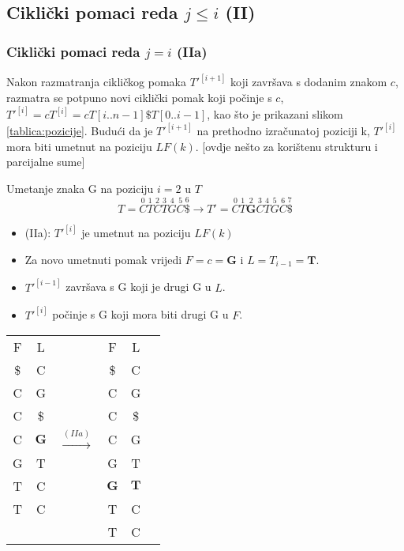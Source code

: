 \documentclass{ferseminar}
\begin{document}
\subsection{Ciklički pomaci reda $j\leq i$ (II)}
\subsubsection{Ciklički pomaci reda $j=i$ (IIa)}
Nakon razmatranja cikličkog pomaka $T'^{[i+1]}$ koji završava s dodanim znakom $c$, razmatra se potpuno novi ciklički pomak koji počinje s $c$, $T'^{[i]}=cT^{[i]}=cT[i..n-1]\$T[0..i-1]$, kao što je prikazani slikom \ref{tablica:pozicije}. Budući da je $T'^{[i+1]}$ na prethodno izračunatoj poziciji k, $T'^[i]$ mora biti umetnut na poziciju $LF(k)$. [ovdje nešto za korištenu strukturu i parcijalne sume]

\begin{minipage}{0.5\textwidth}
\footnotesize
Umetanje znaka G na poziciju $i=2$ u $T$
$$
	T=\overset{0}{C}	\overset{1}{T} \overset{2}{C} \overset{3}{T}	\overset{4}{G}
	\overset{5}{C}	\overset{6}{\$} \rightarrow		
	T'=\overset{0}{C}	\overset{1}{T}	\overset{2}{\boldsymbol{G}}  \overset{3}{C} \overset{4}{T}	\overset{5}{G}
	\overset{6}{C}	\overset{7}{\$} 	
$$
\begin{itemize}
  \item[] (IIa): $T'^{[i]}$ je umetnut na poziciju $LF(k)$
  \item[] Za novo umetnuti pomak vrijedi $F=c=\boldsymbol{G}$ i $L=T_{i-1}=\boldsymbol{T}$.
  \item[] $T'^{[i-1]}$ završava s G koji je drugi G u $L$.
  \item[] $T'^{[i]}$ počinje s G koji mora biti drugi G u $F$.
\end{itemize}

\end{minipage} \hfill
\begin{minipage}{0.45\textwidth}
\hspace{.2\textwidth}
\begin{tabular}{cccc|cc}
	\multicolumn{1}{c|}{F} & L & & F & L \\
	\cline{1-2}	\cline{4-5}
	\multicolumn{1}{c|}{\$} & C & & \$ & C \\
	\multicolumn{1}{c|}{C} & G & & C & G \\
	\multicolumn{1}{c|}{C} & \$ & & C & \$ \\
	
	\multicolumn{1}{c|}{C} & $\boldsymbol{G}$ & $\stackrel{(IIa)}{\longrightarrow}$ & C & G \\
	
	\multicolumn{1}{c|}{G} & T & & G & T \\
	\cline{4-5}
	\multicolumn{1}{c|}{T} & C & & \multicolumn{1}{|c|}{$\boldsymbol{G}$} & \multicolumn{1}{c|}{$\boldsymbol{T}$} \\
	\cline{4-5}
	\multicolumn{1}{c|}{T} & C & & T & C \\
	  &   & & T & C
\end{tabular}

\end{minipage}
\end{document}
